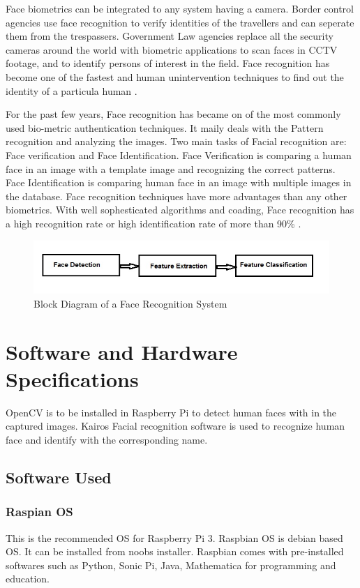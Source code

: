 \documentclass[sigconf]{acmart}
\begin{document}
Face biometrics can be integrated to any system having a camera. Border control agencies use face recognition to verify identities of the travellers and can seperate them from the trespassers. Government Law agencies replace all the security cameras around the world with biometric applications to scan faces in CCTV footage, and to identify persons of interest in the field. Face recognition has become one of the fastest and human unintervention techniques to find out the identity of a particula human \cite{biometrics2016}.

For the past few years, Face recognition has became on of the most commonly used bio-metric authentication techniques. It maily deals with the Pattern recognition and analyzing the images. Two main tasks of Facial recognition are: Face verification and Face Identification. Face Verification is comparing a human face in an image with a template image and recognizing the correct patterns. Face Identification is comparing human face in an image with multiple images in the database. Face recognition techniques have more advantages than any other biometrics. With well sophesticated algorithms and coading, Face recognition has a high recognition rate or high identification rate of more than 90\% \cite{riddhi2013}. 

\begin{figure}[ht!]
  \includegraphics[width=\columnwidth]{images/Face-recognition.jpg}
  \caption{Block Diagram of a Face Recognition System}
\end{figure}


\section{Software and Hardware Specifications}
OpenCV is to be installed in Raspberry Pi to detect human faces with in the captured images. Kairos Facial recognition software is used to recognize human face and identify with the corresponding name.

\subsection{Software Used}

\subsubsection{Raspian OS}
This is the recommended OS for Raspberry Pi 3.  Raspbian OS is debian based OS. It can be installed from noobs installer. Raspbian comes with pre-installed softwares such as Python, Sonic Pi, Java, Mathematica for programming and education.
\end{document}
